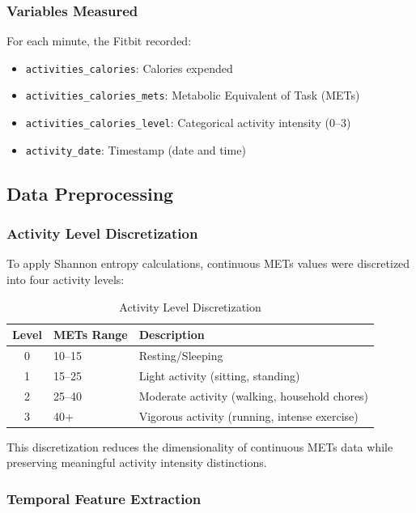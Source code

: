 \documentclass[12pt,letterpaper]{article}
\begin{document}
\subsubsection{Variables Measured}

For each minute, the Fitbit recorded:
\begin{itemize}
    \item \texttt{activities\_calories}: Calories expended
    \item \texttt{activities\_calories\_mets}: Metabolic Equivalent of Task (METs)
    \item \texttt{activities\_calories\_level}: Categorical activity intensity (0--3)
    \item \texttt{activity\_date}: Timestamp (date and time)
\end{itemize}

\subsection{Data Preprocessing}

\subsubsection{Activity Level Discretization}

To apply Shannon entropy calculations, continuous METs values were discretized into four activity levels:

\begin{table}[H]
\centering
\caption{Activity Level Discretization}
\begin{tabular}{cll}
\toprule
\textbf{Level} & \textbf{METs Range} & \textbf{Description} \\
\midrule
0 & 10--15 & Resting/Sleeping \\
1 & 15--25 & Light activity (sitting, standing) \\
2 & 25--40 & Moderate activity (walking, household chores) \\
3 & 40+ & Vigorous activity (running, intense exercise) \\
\bottomrule
\end{tabular}
\end{table}

This discretization reduces the dimensionality of continuous METs data while preserving meaningful activity intensity distinctions.

\subsubsection{Temporal Feature Extraction}
\end{document}
